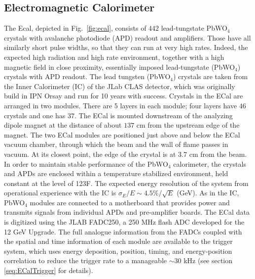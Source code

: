 \subsection{Electromagnetic Calorimeter} 
\label{sec:ecal}

The Ecal, depicted in Fig. \ref{fig:ecal}, consists of $442$ lead-tungstate PbWO$_4$ crystals with avalanche photodiode (APD) readout and amplifiers. Those have all similarly short pulse widths, so that they can run at very high rates. Indeed, the expected high radiation and high rate environment, together with a high magnetic field in close proximity, essentially imposed lead-tungstate (PbWO$_4$) crystals with APD readout. The lead tungsten (PbWO$_4$) crystals are taken from the Inner Calorimeter (IC) of the JLab CLAS detector, which was originally build in IPN Orsay and run for 10 years with success. Crystals in the ECal are arranged in two modules. There are 5 layers in each module; four layers have $46$ crystals and one has $37$. The ECal is mounted downstream of the analyzing dipole magnet at the distance of about $137$ cm from the upstream edge of the magnet. The two ECal modules are positioned just above and below the ECal vacuum chamber, through which the beam and the wall of flame passes in vacuum. At its closest point, the edge of the crystal is at $3.7$ cm from the beam. In order to maintain stable performance of the PbWO$_4$ calorimeter, the crystals and APDs are enclosed within a temperature stabilized environment, held constant at the level of 1\!\char23F. The expected energy resolution of the system from operational experience with the IC is $\sigma_E/E \sim 4.5\%/\sqrt{E}$ (GeV). As in the IC, PbWO$_4$ modules are connected to a motherboard that provides power and transmits signals from individual APDs and pre-amplifier boards. The ECal data is digitized using the JLAB FADC250, a 250 MHz flash ADC developed for the 12 GeV Upgrade. The full analogue information from the FADCs coupled with the spatial and time information of each module are available to the trigger system, which uses energy deposition, position, timing, and energy-position correlation to reduce the trigger rate to a manageable $\sim 30$ kHz (see section \ref{seq:ECalTrigger} for details).

